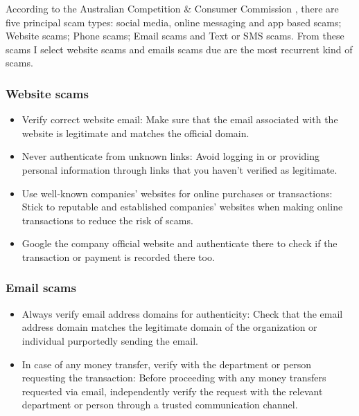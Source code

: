\documentclass[12pt,a4paper]{article}
\begin{document}
According to the Australian Competition \& Consumer Commission \citep{question_4.1}, there are five principal scam types: social media, online messaging and app based scams; Website scams; Phone scams; Email scams and Text or SMS scams. From these scams I select website scams and emails scams due are the most recurrent kind of scams. 

\subsubsection{Website scams}

\begin{itemize}

    \item{Verify correct website email: Make sure that the email associated with the website is legitimate and matches the official domain. }

    \item{Never authenticate from unknown links: Avoid logging in or providing personal information through links that you haven't verified as legitimate. }

    \item{Use well-known companies' websites for online purchases or transactions: Stick to reputable and established companies' websites when making online transactions to reduce the risk of scams. }

    \item{Google the company official website and authenticate there to check if the transaction or payment is recorded there too. }

\end{itemize}

\subsubsection{Email scams}

\begin{itemize}


    \item{Always verify email address domains for authenticity: Check that the email address domain matches the legitimate domain of the organization or individual purportedly sending the email.}

    \item{In case of any money transfer, verify with the department or person requesting the transaction: Before proceeding with any money transfers requested via email, independently verify the request with the relevant department or person through a trusted communication channel.} 

\end{itemize}
\pagebreak






\clearpage
\end{document}
